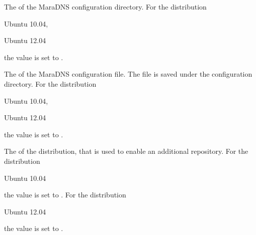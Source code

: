 
The  of the MaraDNS configuration directory.
For the distribution
\begin{inparaitem}
\item[\TheDistribution{ubuntu}] Ubuntu 10.04,
\item[\TheDistribution{ubuntu}] Ubuntu 12.04
\end{inparaitem}
the value is set to .


The  of the MaraDNS configuration file. The file is saved
under the configuration directory.
For the distribution
\begin{inparaitem}
\item[\TheDistribution{ubuntu}] Ubuntu 10.04,
\item[\TheDistribution{ubuntu}] Ubuntu 12.04
\end{inparaitem}
the value is set to .


The  of the distribution, that is used to enable an additional
repository. For the distribution
\begin{inparaitem}
\item[\TheDistribution{ubuntu}] Ubuntu 10.04
\end{inparaitem}
the value is set to .
For the distribution
\begin{inparaitem}
\item[\TheDistribution{ubuntu}] Ubuntu 12.04
\end{inparaitem}
the value is set to .


